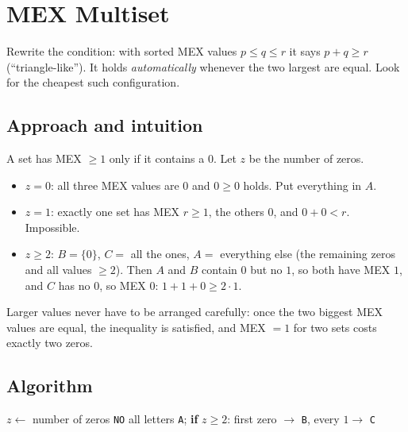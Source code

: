 \section{MEX Multiset}
\label{sec:g-mex-multiset}


\begin{patternbox}
Rewrite the condition: with sorted MEX values $p\le q\le r$ it says
$p+q\ge r$ (``triangle-like''). It holds \emph{automatically} whenever the two
largest are equal. Look for the cheapest such configuration.
\end{patternbox}

\subsection*{Approach and intuition}

A set has MEX $\ge1$ only if it contains a $0$. Let $z$ be the number of
zeros.
\begin{itemize}
  \item $z=0$: all three MEX values are $0$ and $0\ge0$ holds. Put
        everything in $A$.
  \item $z=1$: exactly one set has MEX $r\ge1$, the others $0$, and $0+0<r$.
        Impossible.
  \item $z\ge2$: $B=\{0\}$, $C=$ all the ones, $A=$ everything else (the
        remaining zeros and all values $\ge2$). Then $A$ and $B$ contain $0$
        but no $1$, so both have MEX $1$, and $C$ has no $0$, so MEX $0$:
        $1+1+0\ge 2\cdot1$.
\end{itemize}

\begin{ideabox}
Larger values never have to be arranged carefully: once the two biggest MEX
values are equal, the inequality is satisfied, and MEX $=1$ for two sets costs
exactly two zeros.
\end{ideabox}

\subsection*{Algorithm}
\begin{algorithmic}[1]
\State $z\gets$ number of zeros
 \Return \texttt{NO} \EndIf
\State all letters \texttt{A}; \textbf{if} $z\ge2$: first zero $\to$ \texttt{B}, every $1\to$ \texttt{C}
\end{algorithmic}

